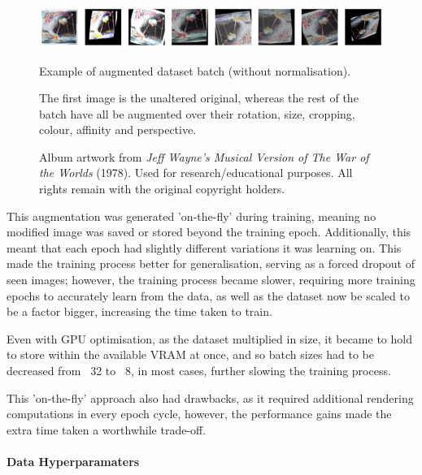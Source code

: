                         \begin{figure}[h]
                            \centering
                            \includegraphics[width=\textwidth]{images/AugmentedArts.png}
                            \caption{Example of augmented dataset batch (without normalisation).}
                            \label{fig:augmentedArts}
                            \caption*{
                                The first image is the unaltered original, whereas the rest of the batch have all be augmented over their rotation, size, cropping, colour, affinity and perspective.
                            }
                            \caption*{
                                Album artwork from \textit{Jeff Wayne's Musical Version of The War of the Worlds} (1978).  
                                \footnotesize Used for research/educational purposes. All rights remain with the original copyright holders.
                            }
                        \end{figure}
    
                        This augmentation was generated 'on-the-fly' during training, meaning no modified image was saved or stored beyond the training epoch. Additionally, this meant that each epoch had slightly different variations it was learning on. This made the training process better for generalisation, serving as a forced dropout of seen images; however, the training process became slower, requiring more training epochs to accurately learn from the data, as well as the dataset now be scaled to be a factor bigger, increasing the time taken to train.
    
                        Even with GPU optimisation, as the dataset multiplied in size, it became to hold to store within the available VRAM at once, and so batch sizes had to be decreased from ~32 to ~8, in most cases, further slowing the training process.
    
                        This 'on-the-fly' approach also had drawbacks, as it required additional rendering computations in every epoch cycle, however, the performance gains made the extra time taken a worthwhile trade-off.
        
                    \paragraph{Data Hyperparamaters}
    
